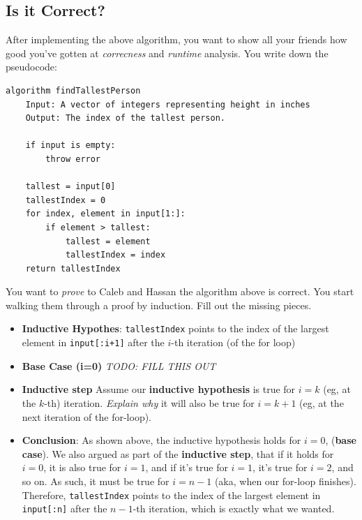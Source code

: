 \documentclass [12pt]{article}
\begin{document}
\subsection{Is it Correct?}
 After implementing the above algorithm, you want to show all your friends how good you've gotten at \textit{correcness} and \textit{runtime} analysis. You write down the pseudocode:

\begin{verbatim}
algorithm findTallestPerson
    Input: A vector of integers representing height in inches
    Output: The index of the tallest person.

    if input is empty:
        throw error

    tallest = input[0]
    tallestIndex = 0
    for index, element in input[1:]:
        if element > tallest:
            tallest = element
            tallestIndex = index
    return tallestIndex
\end{verbatim}

You want to \textit{prove} to Caleb and Hassan the algorithm above is correct. You start walking them through a proof by induction. Fill out the missing pieces.

\begin{itemize}
    \item \textbf{Inductive Hypothes}: \texttt{tallestIndex} points to the index of the largest element in \texttt{input[:i+1]} after the $i$-th iteration (of the for loop)
    \item {} \textbf{Base Case (i=0)} \textit{TODO: FILL THIS OUT}
    \item {} \textbf{Inductive step} Assume our \textbf{inductive hypothesis} is true for $i = k$ (eg, at the $k$-th) iteration. \textit{Explain why} it will also be true for $i = k + 1$ (eg, at the next iteration of the for-loop).
    \item \textbf{Conclusion}: As shown above, the inductive hypothesis holds for $i = 0$, (\textbf{base case}). We also argued as part of the \textbf{inductive step}, that if it holds for $i=0$, it is also true for $i=1$, and if it's true for $i =1$, it's true for $i=2$, and so on. As such, it must be true for $i = n -1$ (aka, when our for-loop finishes). Therefore, \texttt{tallestIndex} points to the index of the largest element in \texttt{input[:n]} after the $n-1$-th iteration, which is exactly what we wanted.
\end{itemize}


\end{document}
